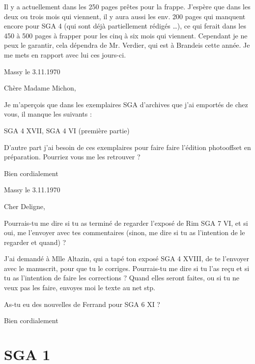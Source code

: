 \documentclass[11pt,a4paper]{article}
\begin{document}
Il y a actuellement dans les 250 pages prêtes pour la frappe. J'espère que dans
les deux ou trois mois qui viennent, il y aura aussi les env. 200 pages qui
manquent encore pour SGA 4 (qui sont déjà partiellement rédigés \ldots), ce qui
ferait dans les 450 à 500 pages à frapper pour les cinq à six mois qui viennent.
Cependant je ne peux le garantir, cela dépendra de Mr. Verdier, qui est à
Brandeis cette année. Je me mets en rapport avec lui ces jours-ci.


Massy le 3.11.1970

Chère Madame Michon,

Je m'aperçois que dans les exemplaires SGA d'archives que j'ai emportés de chez
vous, il manque les suivants :

SGA 4 XVII, SGA 4 VI (première partie)

D'autre part j'ai besoin de ces exemplaires pour faire faire l'édition
photooffset en préparation. Pourriez vous me les retrouver ?

Bien cordialement


Massy le 3.11.1970

Cher Deligne,

Pourrais-tu me dire si tu as terminé de regarder l'exposé de Rim SGA 7 VI, et si
oui, me l'envoyer avec tes commentaires (sinon, me dire si tu as l'intention de
le regarder et quand) ?

J'ai demandé à Mlle Altazin, qui a tapé ton exposé SGA 4 XVIII, de te l'envoyer
avec le manuscrit, pour que tu le corriges. Pourrais-tu me dire si tu l'as reçu
et si tu as l'intention de faire les corrections ? Quand elles seront faites, ou
si tu ne veux pas les faire, envoyes moi le texte au net stp.

As-tu eu des nouvelles de Ferrand pour SGA 6 XI ?

Bien cordialement

\section*{SGA 1}

\end{document}
